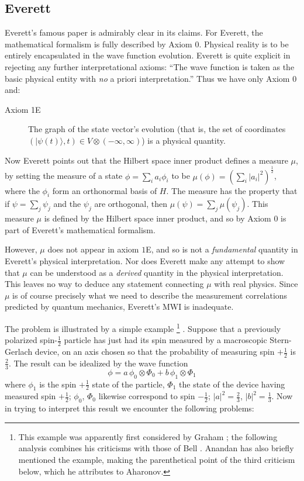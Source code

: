 \documentclass[aps,pra,12pt]{revtex4}
\def\ket#1{| #1\rangle}
\begin{document}
\subsection{Everett}

Everett's famous paper \cite{ev} is admirably clear in its claims. 
For Everett, the mathematical formalism is fully described by Axiom $0$. 
Physical reality is to be entirely encapsulated in the wave function 
evolution. 
Everett is quite explicit in rejecting any further interpretational
axioms: ``The wave function is taken as the basic physical entity 
with {\em no} a priori interpretation.''
Thus we have only Axiom $0$ and:
\begin{description}
\item[Axiom 1E] The graph of the state vector's evolution 
(that is, the set of coordinates
$(\ket {\psi (t)},t) \in V \otimes (-\infty , \infty)$)
is a physical quantity. 
\end{description}

Now Everett points out that 
the Hilbert space inner product defines a measure $\mu$, by setting the measure
of a state \mbox{$\phi = \sum_{i} a_i \phi_i$} to be \mbox{$\mu( \phi ) = 
(\sum_i | a_i |^2 )^{\frac{1}{2}}$}, where the $\phi_i $ form an orthonormal 
basis of $H$. The measure has the property that if $\psi = \sum_j \psi_j$ and
the $\psi_j$ are orthogonal, then $\mu (\psi ) = \sum_j \mu (\psi_j )$. 
This measure $\mu$ is defined by the Hilbert space inner product, and so
by Axiom $0$ is part of Everett's mathematical formalism.

However, $\mu$ does not appear in axiom $1$E, and 
so is not a {\em fundamental} 
quantity in Everett's physical interpretation.
Nor does Everett make any attempt to show that $\mu$ can be understood as
a {\em derived} quantity in the physical interpretation. 
This leaves no way to deduce any statement connecting $\mu$ with real physics.
Since $\mu$ is of course precisely what we need to describe the measurement
correlations predicted by quantum mechanics, Everett's MWI is 
inadequate. 

The problem is illustrated by a simple 
example \footnote{This example was apparently
first considered by Graham \cite{gr};  the 
following analysis combines his criticisms with those of Bell \cite{bell2}.
Anandan\cite{anandan} has also briefly mentioned the example, making the 
parenthetical point of the third criticism below, which he attributes to 
Aharonov.} .
Suppose that a previously polarized 
spin-$\frac{1}{2}$ particle has just had its 
spin measured by
a macroscopic Stern-Gerlach device, on an axis chosen so that 
the probability of measuring spin $+\frac{1}{2}$ is $\frac{2}{3}$. 
The result can be idealized by the wave function
\begin{equation}
\phi = a \, \phi_0 \otimes \Phi_0 + b \, \phi_1 \otimes \Phi_1
\end{equation}
where $\phi_1$ is the spin $+\frac{1}{2}$ state of 
the particle, $\Phi_1$ the state of the device having measured 
spin $+\frac{1}{2}$; $\phi_0$, $\Phi_0$ likewise correspond to 
spin $-\frac{1}{2}$; $|a|^2 = \frac{2}{3}$, $|b|^2 = \frac{1}{3}$.
Now in trying to interpret this result we encounter the following problems:
\end{document}
